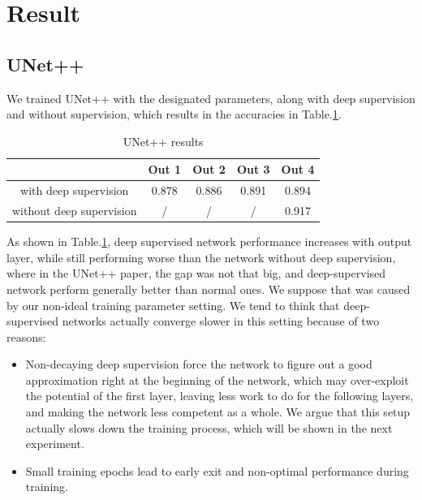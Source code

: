 \section{Result}
\subsection{UNet++}
We trained UNet++ with the designated parameters, along with deep supervision and without supervision, which results in the accuracies in Table.\ref{tab:unetppResult}.

\begin{table}[!htbp]
\centering
\caption{UNet++ results}\label{tab:unetppResult}
\begin{tabular}{c|c|c|c|c}
\hline
& Out 1&Out 2&Out 3&Out 4\\    
\hline
with deep supervision & 0.878 & 0.886 & 0.891 & 0.894\\
without deep supervision & / & / & / & 0.917\\
\hline
\end{tabular}
\end{table}

As shown in Table.\ref{tab:unetppResult}, deep supervised network performance increases with output layer, while still performing worse than the network without deep supervision, where in the UNet++ paper\cite{unet_pp}, the gap was not that big, and deep-supervised network perform generally better than normal ones. We suppose that was caused by our non-ideal training parameter setting. We tend to think that deep-supervised networks actually converge slower in this setting because of two reasons:
\begin{itemize}
    \item Non-decaying deep supervision force the network to figure out a good approximation right at the beginning of the network, which may over-exploit the potential of the first layer, leaving less work to do for the following layers, and making the network less competent as a whole. We argue that this setup actually slows down the training process, which will be shown in the next experiment.
    \item Small training epochs lead to early exit and non-optimal performance during training.
\end{itemize}

